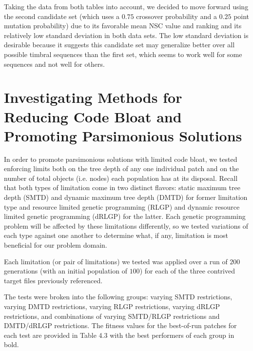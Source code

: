 \documentclass[a4paper,12pt]{report} 	%
\numberwithin{figure}{chapter}
\numberwithin{table}{chapter}
\numberwithin{equation}{chapter}
\begin{document}
\begin{flushleft}
Taking the data from both tables into account, we decided to move forward using the second candidate set (which uses a $0.75$ crossover probability and a $0.25$ point mutation probability) due to its favorable mean NSC value and ranking and its relatively low standard deviation in both data sets. The low standard deviation is desirable because it suggests this candidate set may generalize better over all possible timbral sequences than the first set, which seems to work well for some sequences and not well for others.

\section{Investigating Methods for Reducing Code Bloat and Promoting Parsimonious Solutions}
In order to promote parsimonious solutions with limited code bloat, we tested enforcing limits both on the tree depth of any one individual patch and on the number of total objects (i.e. nodes) each population has at its disposal. Recall that both types of limitation come in two distinct flavors: static maximum tree depth (SMTD) and dynamic maximum tree depth (DMTD) for former limitation type and resource limited genetic programming (RLGP) and dynamic resource limited genetic programming (dRLGP) for the latter. Each genetic programming problem will be affected by these limitations differently, so we tested variations of each type against one another to determine what, if any, limitation is most beneficial for our problem domain. 

Each limitation (or pair of limitations) we tested was applied over a run of $200$ generations (with an initial population of $100$) for each of the three contrived target files previously referenced.

The tests were broken into the following groups: varying SMTD restrictions, varying DMTD restrictions, varying RLGP restrictions, varying dRLGP restrictions, and combinations of varying SMTD/RLGP restrictions and DMTD/dRLGP restrictions. The fitness values for the best-of-run patches for each test are provided in Table 4.3 with the best performers of each group in bold.


\end{flushleft}
\end{document}
